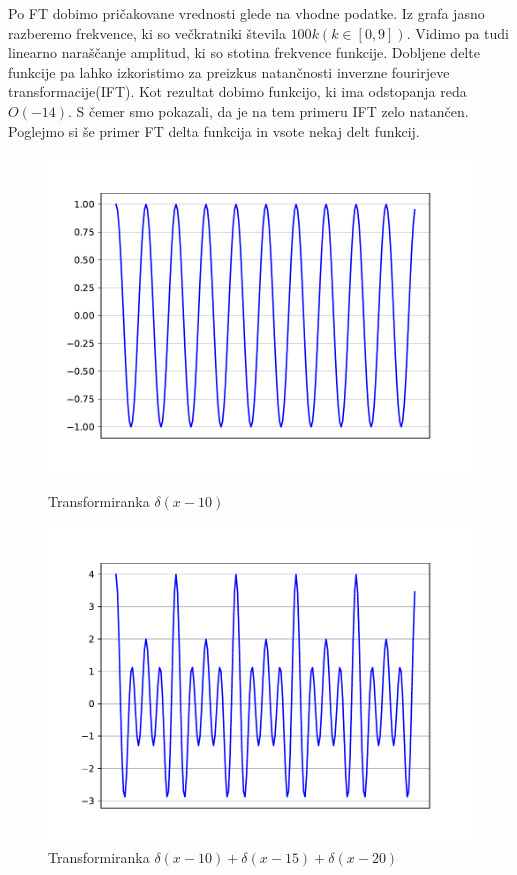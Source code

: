 \documentclass{article}
\begin{document}
Po FT dobimo pričakovane vrednosti glede na vhodne podatke. Iz grafa jasno razberemo frekvence, ki so večkratniki števila $100k (k \in [0, 9])$. Vidimo pa tudi linearno naraščanje amplitud, ki so stotina frekvence funkcije.
Dobljene delte funkcije pa lahko izkoristimo za preizkus natančnosti inverzne fourirjeve transformacije(IFT). Kot rezultat dobimo funkcijo, ki ima odstopanja reda $O(-14)$. S čemer smo pokazali, da je na tem primeru IFT zelo natančen. Poglejmo si še primer FT delta funkcija in vsote nekaj delt funkcij.

\begin{figure}[H]
    \centering
    \begin{minipage}{0.48\textwidth}
        \centering
        \includegraphics[width=\textwidth]{deltasingle.pdf}
		\caption{Transformiranka $\delta(x - 10)$}
    \end{minipage}
    \hfill
    \begin{minipage}{0.48\textwidth}
        \centering
        \includegraphics[width=\textwidth]{delta.pdf}
		\caption{Transformiranka $\delta(x - 10) + \delta(x - 15) + \delta(x -20)$ }
    \end{minipage}
\end{figure}
\end{document}
